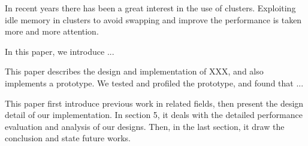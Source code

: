 \begin{eabstract}

In recent years there has been a great interest in the use of clusters.
Exploiting idle memory in clusters to avoid swapping and improve the performance
is taken more and more attention.

In this paper, we introduce ...

This paper describes the design and implementation of XXX, and also implements
a prototype. We tested and profiled the prototype, and found that ...

This paper first introduce previous work in related fields, then present the
design detail of our implementation. In section 5, it deals with the detailed
performance evaluation and analysis of our designs. Then, in the last section,
it draw the conclusion and state future works.

\end{eabstract}


